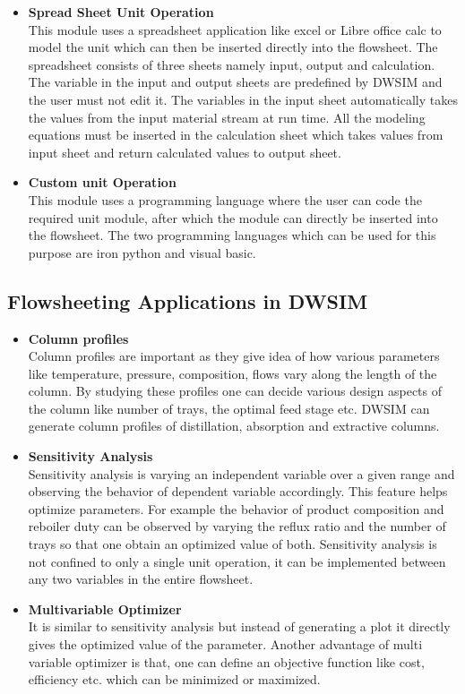 \documentclass[12pt]{report}
\begin{document}
\begin{itemize}
\item {\textbf{Spread Sheet Unit Operation}} \\
This module uses a spreadsheet application like excel or Libre office calc to model the unit which can then be inserted directly into the flowsheet. The spreadsheet consists of three sheets namely input, output and calculation. The variable in the input and output sheets are predefined by DWSIM and the user must not edit it. The variables in the input sheet automatically takes the values from the input material stream at run time. All the modeling equations must be inserted in the calculation sheet which takes values from input sheet and return calculated values to output sheet.
\item{\textbf{Custom unit Operation}} \\
This module uses a programming language where the user can code the required unit module, after which the module can directly be inserted into the flowsheet. The two programming languages which can be used for this purpose are iron python and visual basic.
\end{itemize}

\subsection{Flowsheeting Applications in DWSIM}
\begin{itemize}
\item {\textbf{Column profiles}} \\
Column profiles are important as they give idea of how various parameters like temperature, pressure, composition, flows vary along the length of the column. By studying these profiles one can decide various design aspects of the column like number of trays, the optimal feed stage etc. DWSIM can generate column profiles of distillation, absorption and extractive columns.

\item{\textbf{Sensitivity Analysis}} \\
Sensitivity analysis is varying an independent variable over a given range and observing the behavior of dependent variable accordingly. This feature helps optimize parameters. For example the behavior of product composition and reboiler duty can be observed by varying the reflux ratio and the number of trays so that one obtain an optimized value of both. Sensitivity analysis is not confined to only a single unit operation, it can be implemented between any two variables in the entire flowsheet.

\item{\textbf{Multivariable Optimizer}} \\
It is similar to sensitivity analysis but instead of generating a plot it directly gives the optimized value of the parameter. Another advantage of multi variable optimizer is that, one can define an objective function like cost, efficiency etc. which can be minimized or maximized.

\end{itemize}
\end{document}
